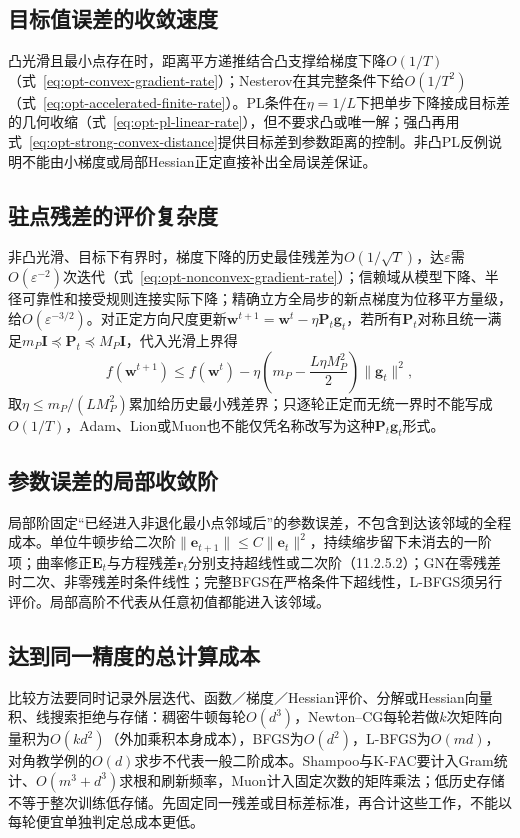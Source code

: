 \subsection{目标值误差的收敛速度}

凸光滑且最小点存在时，距离平方递推结合凸支撑给梯度下降$O(1/T)$（式~\eqref{eq:opt-convex-gradient-rate}）；Nesterov在其完整条件下给$O(1/T^2)$（式~\eqref{eq:opt-accelerated-finite-rate}）。PL条件在$\eta=1/L$下把单步下降接成目标差的几何收缩（式~\eqref{eq:opt-pl-linear-rate}），但不要求凸或唯一解；强凸再用式~\eqref{eq:opt-strong-convex-distance}提供目标差到参数距离的控制。非凸PL反例说明不能由小梯度或局部Hessian正定直接补出全局误差保证。

\subsection{驻点残差的评价复杂度}

非凸光滑、目标下有界时，梯度下降的历史最佳残差为$O(1/\sqrt T)$，达$\varepsilon$需$O(\varepsilon^{-2})$次迭代（式~\eqref{eq:opt-nonconvex-gradient-rate}）；信赖域从模型下降、半径可靠性和接受规则连接实际下降；精确立方全局步的新点梯度为位移平方量级，给$O(\varepsilon^{-3/2})$。对正定方向尺度更新$\bm w^{t+1}=\bm w^t-\eta\bm P_t\bm g_t$，若所有$\bm P_t$对称且统一满足$m_P\bm I\preceq\bm P_t\preceq M_P\bm I$，代入光滑上界得
\[
 f(\bm w^{t+1})\leq f(\bm w^t)
 -\eta\left(m_P-\frac{L\eta M_P^2}{2}\right)\|\bm g_t\|^2,
\]
取$\eta\leq m_P/(LM_P^2)$累加给历史最小残差界；只逐轮正定而无统一界时不能写成$O(1/T)$，Adam、Lion或Muon也不能仅凭名称改写为这种$\bm P_t\bm g_t$形式。

\subsection{参数误差的局部收敛阶}

局部阶固定“已经进入非退化最小点邻域后”的参数误差，不包含到达该邻域的全程成本。单位牛顿步给二次阶$\|\bm e_{t+1}\|\leq C\|\bm e_t\|^2$，持续缩步留下未消去的一阶项；曲率修正$\bm E_t$与方程残差$\bm r_t$分别支持超线性或二次阶（11.2.5.2）；GN在零残差时二次、非零残差时条件线性；完整BFGS在严格条件下超线性，L-BFGS须另行评价。局部高阶不代表从任意初值都能进入该邻域。

\subsection{达到同一精度的总计算成本}

比较方法要同时记录外层迭代、函数／梯度／Hessian评价、分解或Hessian向量积、线搜索拒绝与存储：稠密牛顿每轮$O(d^3)$，Newton--CG每轮若做$k$次矩阵向量积为$O(kd^2)$（外加乘积本身成本），BFGS为$O(d^2)$，L-BFGS为$O(md)$，对角教学例的$O(d)$求步不代表一般二阶成本。Shampoo与K-FAC要计入Gram统计、$O(m^3+d^3)$求根和刷新频率，Muon计入固定次数的矩阵乘法；低历史存储不等于整次训练低存储。先固定同一残差或目标差标准，再合计这些工作，不能以每轮便宜单独判定总成本更低。

